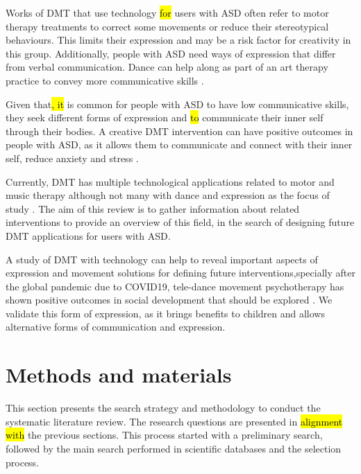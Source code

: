 \documentclass[a4paper,fleqn]{cas-sc}
\begin{document}
Works of DMT that use technology \hl{for} users with ASD often refer to motor therapy treatments to correct some movements or reduce their stereotypical behaviours. This limits their expression and may be a risk factor for creativity in this group. Additionally, people with ASD need ways of expression that differ from verbal communication. Dance can help along as part of an art therapy practice to convey more communicative skills \cite{Takahashi2019}.

Given that\hl{, it} is common for people with ASD to have low communicative skills, they seek different forms of expression and \hl{to} communicate their inner self through their bodies. A creative DMT intervention can have positive outcomes in people with ASD, as it allows them to communicate and connect with their inner self,  reduce anxiety and stress \cite{Martin18}.



Currently, DMT has multiple technological applications related to motor and music therapy although not many with dance and expression as the focus of study \cite{Ragone21}. The aim of this review is to gather information about related interventions to provide an overview of this field, in the search of designing future DMT applications for users with ASD.

A study of DMT with technology can help to reveal important aspects of expression and movement solutions for defining future interventions,specially after the global pandemic due to COVID19, tele-dance movement psychotherapy has shown positive outcomes in social development that should be explored \cite{Moo23, Araya2024}. We validate this form of expression, as it brings benefits to children and allows alternative forms of communication and expression.


\section{Methods and materials} %
\label{sec3:methods}
This section presents the search strategy and methodology to conduct the systematic literature review. The research questions are presented in \hl{alignment with} the previous sections. This process started with a preliminary search, followed by the main search performed in scientific databases and the selection process.
\end{document}
